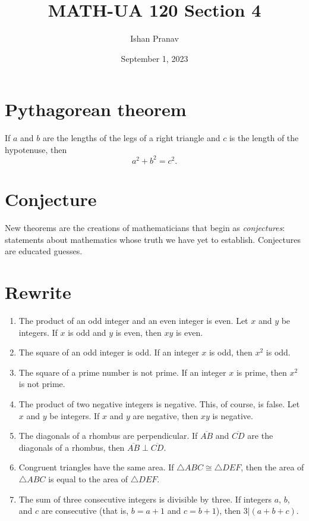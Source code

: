 \documentclass[12pt]{article}
\title{MATH-UA 120 Section 4}
\author{Ishan Pranav}
\date{September 1, 2023}
\begin{document}
\maketitle
\section*{Pythagorean theorem}
If $a$ and $b$ are the lengths of the legs of a right triangle and $c$ is the length of the hypotenuse, then
\[a^2+b^2=c^2.\]
\section*{Conjecture}
New theorems are the creations of mathematicians that begin as \textit{conjectures}: statements about mathematics whose truth we have yet to establish. Conjectures are educated guesses.
\section{Rewrite}
\begin{enumerate}
    \item The product of an odd integer and an even integer is even. Let $x$ and $y$ be integers. If $x$ is odd and $y$ is even, then $xy$ is even.
    \item The square of an odd integer is odd. If an integer $x$ is odd, then $x^2$ is odd.
    \item The square of a prime number is not prime. If an integer $x$ is prime, then $x^2$ is not prime.
    \item The product of two negative integers is negative. This, of course, is false. Let $x$ and $y$ be integers. If $x$ and $y$ are negative, then $xy$ is negative.
    \item The diagonals of a rhombus are perpendicular. If $\overline{AB}$ and $\overline{CD}$ are the diagonals of a rhombus, then $\overline{AB}\perp\overline{CD}$.
    \item Congruent triangles have the same area. If $\triangle ABC\cong\triangle DEF$, then the area of $\triangle ABC$ is equal to the area of $\triangle DEF$.
    \item The sum of three consecutive integers is divisible by three. If integers $a$, $b$, and $c$ are consecutive (that is, $b=a+1$ and $c=b+1$), then $3|(a+b+c)$.
\end{enumerate}
\end{document}

